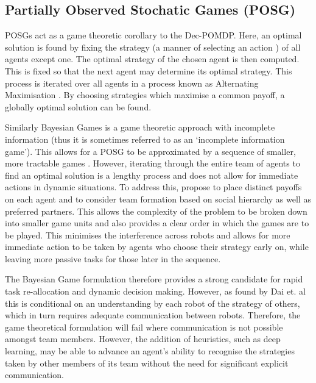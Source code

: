 \documentclass[.../main.tex]{subfiles}
\begin{document}

\subsection{Partially Observed Stochatic Games (POSG)} \label{sec::Stochastic_Games}

POSGs act as a game theoretic corollary to the Dec-POMDP. Here, an
optimal solution  is found by fixing the strategy (a
manner of selecting an action \cite{Rizk2018}) of all agents except
one. The optimal strategy of the chosen agent is then computed. This
is fixed so that the next agent may determine its optimal
strategy. This process is iterated over all agents in a process known
as Alternating Maximisation \cite{Ray2010}. By choosing strategies
which maximise a common payoff, a globally optimal solution can be
found.

Similarly Bayesian Games is a game theoretic approach with incomplete
information (thus it is sometimes referred to as an ‘incomplete
information game’). This allows for a POSG to be approximated by a
sequence of smaller, more tractable games
\cite{Emery-Montemerlo}. However, iterating through the entire team of
agents to find an optimal solution is a lengthy process and does not
allow for immediate actions in dynamic situations. To address this,
\cite{Ray2010} propose to place distinct payoffs on each agent and to
consider team formation based on social hierarchy as well as preferred
partners. This allows the complexity of the problem to be broken down
into smaller game units and also provides a clear order in which the
games are to be played. This minimises the interference across robots
and allows for more immediate action to be taken by agents who choose
their strategy early on, while leaving more passive tasks for those
later in the sequence.

The Bayesian Game formulation therefore provides a strong candidate
for rapid task re-allocation and dynamic decision making. However, as
found by Dai et. al \cite{Dai2018} this is conditional on an
understanding by each robot of the strategy of others, which in turn
requires adequate communication between robots. Therefore, the game
theoretical formulation will fail where communication is not possible
amongst team members. However, the addition of heuristics, such as
deep learning, may be able to advance an agent’s ability to recognise
the strategies taken by other members of its team without the need for
significant explicit communication.
\end{document}
